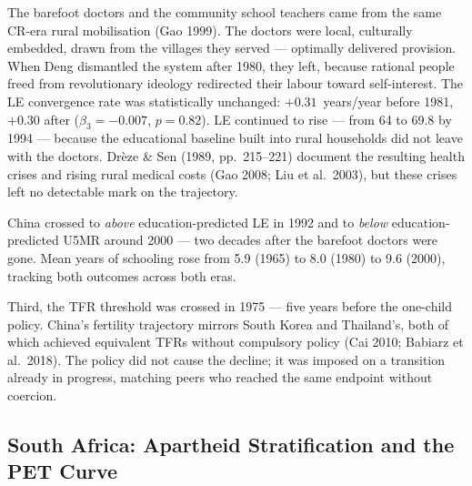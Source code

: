 \documentclass[12pt,letterpaper]{article}
\begin{document}
The barefoot doctors and the community school teachers came from the same
CR-era rural mobilisation (Gao 1999). The doctors were local, culturally embedded,
drawn from the villages they served --- optimally delivered provision.
When Deng dismantled the system after 1980, they left, because rational
people freed from revolutionary ideology redirected their labour toward
self-interest. The LE convergence rate was statistically unchanged:
$+0.31$~years/year before 1981, $+0.30$ after ($\beta_3 = -0.007$, $p =
0.82$). LE continued to rise --- from 64 to 69.8 by 1994 --- because
the educational baseline built into rural households did not leave with
the doctors. Drèze \& Sen (1989, pp.~215--221) document the resulting
health crises and rising rural medical costs (Gao 2008; Liu et
al.~2003), but these crises left no detectable mark on the trajectory.

China crossed to \emph{above} education-predicted LE in 1992 and to
\emph{below} education-predicted U5MR around 2000 --- two decades after
the barefoot doctors were gone. Mean years of schooling rose from 5.9
(1965) to 8.0 (1980) to 9.6 (2000), tracking both outcomes across both
eras.

Third, the TFR threshold was crossed in
1975 --- five years before the one-child policy. China's
fertility trajectory mirrors South Korea and Thailand's, both of
which achieved equivalent TFRs without compulsory policy (Cai 2010;
Babiarz et al.~2018). The policy did not cause the decline; it was imposed on a
transition already in progress, matching peers who reached the same
endpoint without coercion.

\subsection{South Africa: Apartheid Stratification and the PET Curve}\label{south-africa-case}
\end{document}
